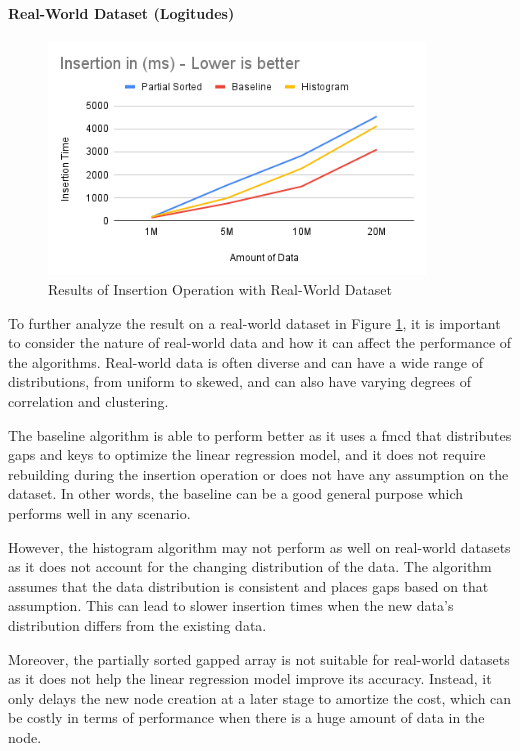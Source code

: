\documentclass[11pt,a4paper]{article}
\begin{document}
\paragraph{Real-World Dataset (Logitudes)}
\begin{figure}
    \centering
    \includegraphics[width=100mm,scale=1]{Figures/InsertionResultLongitude.png}
    \caption{
     Results of Insertion Operation with Real-World Dataset 
    }
    \label{fig:GraphInsertionResultLongitude}
\end{figure}
To further analyze the result on a real-world dataset in Figure \ref{fig:GraphInsertionResultLongitude}, it is important to consider the nature of real-world data and how it can affect the performance of the algorithms. Real-world data is often diverse and can have a wide range of distributions, from uniform to skewed, and can also have varying degrees of correlation and clustering.

The baseline algorithm is able to perform better as it uses a \acrshort{fmcd} that distributes gaps and keys to optimize the linear regression model, and it does not require rebuilding during the insertion operation or does not have any assumption on the dataset. In other words, the baseline can be a good general purpose which performs well in any scenario. 

However, the histogram algorithm may not perform as well on real-world datasets as it does not account for the changing distribution of the data. The algorithm assumes that the data distribution is consistent and places gaps based on that assumption. This can lead to slower insertion times when the new data's distribution differs from the existing data.

Moreover, the partially sorted gapped array is not suitable for real-world datasets as it does not help the linear regression model improve its accuracy. Instead, it only delays the new node creation at a later stage to amortize the cost, which can be costly in terms of performance when there is a huge amount of data in the node.
\end{document}
